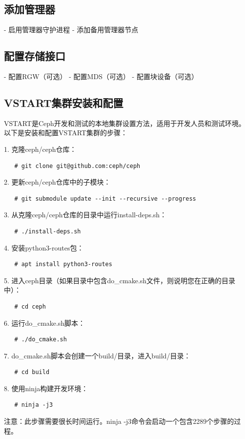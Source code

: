 \documentclass[12pt,UTF8]{ctexbook}
\begin{document}
\subsection{添加管理器}
- 启用管理器守护进程
- 添加备用管理器节点

\subsection{配置存储接口}
- 配置RGW（可选）
- 配置MDS（可选）
- 配置块设备（可选）

\subsection{VSTART集群安装和配置}

VSTART是Ceph开发和测试的本地集群设置方法，适用于开发人员和测试环境。以下是安装和配置VSTART集群的步骤：

1. 克隆ceph/ceph仓库：
   \begin{verbatim}
   # git clone git@github.com:ceph/ceph
   \end{verbatim}

2. 更新ceph/ceph仓库中的子模块：
   \begin{verbatim}
   # git submodule update --init --recursive --progress
   \end{verbatim}

3. 从克隆ceph/ceph仓库的目录中运行install-deps.sh：
   \begin{verbatim}
   # ./install-deps.sh
   \end{verbatim}

4. 安装python3-routes包：
   \begin{verbatim}
   # apt install python3-routes
   \end{verbatim}

5. 进入ceph目录（如果目录中包含do_cmake.sh文件，则说明您在正确的目录中）：
   \begin{verbatim}
   # cd ceph
   \end{verbatim}

6. 运行do_cmake.sh脚本：
   \begin{verbatim}
   # ./do_cmake.sh
   \end{verbatim}

7. do_cmake.sh脚本会创建一个build/目录，进入build/目录：
   \begin{verbatim}
   # cd build
   \end{verbatim}

8. 使用ninja构建开发环境：
   \begin{verbatim}
   # ninja -j3
   \end{verbatim}
   注意：此步骤需要很长时间运行。ninja -j3命令会启动一个包含2289个步骤的过程。
\end{document}
